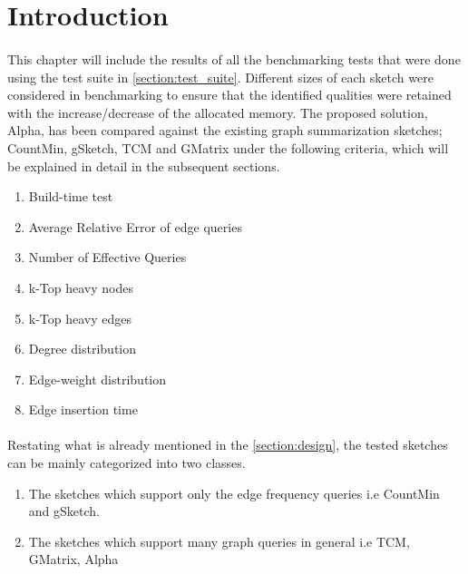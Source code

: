 \section{Introduction}

\paragraph{}
This chapter will include the results of all the benchmarking tests that were done using the test suite in \autoref{section:test_suite}. Different sizes of each sketch were considered in benchmarking to ensure that the identified qualities were retained with the increase/decrease of the allocated memory. The proposed solution, Alpha, has been compared against the existing graph summarization sketches; CountMin, gSketch, TCM and GMatrix under the following criteria, which will be explained in detail in the subsequent sections.

\begin{enumerate}
    \item Build-time test
    \item Average Relative Error of edge queries
    \item Number of Effective Queries
    \item k-Top heavy nodes
    \item k-Top heavy edges
    \item Degree distribution
    \item Edge-weight distribution
    \item Edge insertion time
\end{enumerate}

\paragraph{}
Restating what is already mentioned in the \autoref{section:design}, the tested sketches can be mainly categorized into two classes.

\begin{enumerate}
    \item The sketches which support only the edge frequency queries i.e CountMin and gSketch.
    \item The sketches which support many graph queries in general i.e TCM, GMatrix, Alpha
\end{enumerate}

